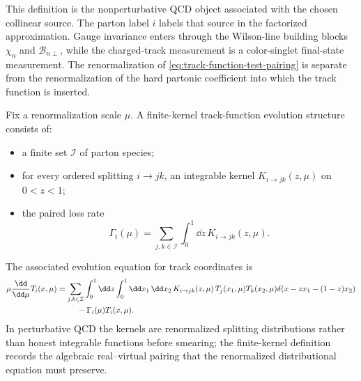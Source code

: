 This definition is the nonperturbative QCD object associated with the chosen
collinear source.  The parton label \(i\) labels that source in the
factorized approximation.  Gauge invariance enters through the Wilson-line
building blocks \(\chi_n\) and \(\mathcal B_{n\perp}\), while the
charged-track measurement is a color-singlet final-state measurement.  The
renormalization of \eqref{eq:track-function-test-pairing} is separate from
the renormalization of the hard partonic coefficient into which the
track function is inserted.

\begin{definition}
\label{def:paired-track-function-evolution}
Fix a renormalization scale \(\mu\).  A finite-kernel track-function evolution
structure consists of:
\begin{itemize}
  \item a finite set \(\mathcal I\) of parton species;
  \item for every ordered splitting \(i\to jk\), an integrable kernel
  \(K_{i\to jk}(z,\mu)\) on \(0<z<1\);
  \item the paired loss rate
  \[
    \Gamma_i(\mu)
    =
    \sum_{j,k\in\mathcal I}\int_0^1\dd z\,K_{i\to jk}(z,\mu).
  \]
\end{itemize}
The associated evolution equation for track coordinates is
\begin{align}
  \mu\frac{\dd}{\dd\mu}T_i(x,\mu)
  &=
  \sum_{j,k\in\mathcal I}
  \int_0^1\dd z
  \int_0^1\dd x_1\,\dd x_2\,
  K_{i\to jk}(z,\mu)\,
  T_j(x_1,\mu)T_k(x_2,\mu)
  \delta\!\left(x-zx_1-(1-z)x_2\right)
  \nonumber\\
  &\hspace{2.5em}
  -\Gamma_i(\mu)T_i(x,\mu).
  \label{eq:paired-track-function-evolution}
\end{align}
In perturbative QCD the kernels are renormalized splitting distributions
rather than honest integrable functions before smearing; the finite-kernel
definition records the algebraic real--virtual pairing that the
renormalized distributional equation must preserve.
\end{definition}

